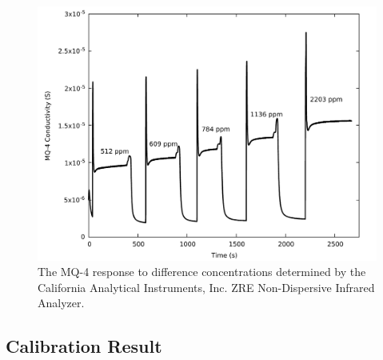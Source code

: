\documentclass[sensors,article,submit,moreauthors,pdftex]{Definitions/mdpi}
\begin{document}
	
			\begin{figure}[!t]
				\centering
				\includegraphics[width=\columnwidth]{honey6.pdf}
				\caption{The MQ-4 response to difference  concentrations determined by the California Analytical Instruments, Inc. ZRE Non-Dispersive Infrared Analyzer.}
				\label{fig:mq4step}
			\end{figure}
			
		\subsection{Calibration Result}
			\label{sec:calibration}
\end{document}
